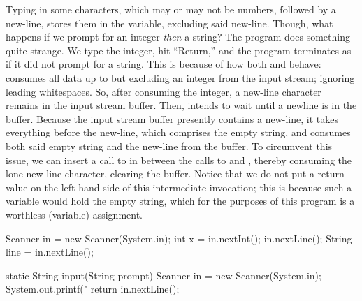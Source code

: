 Typing in some characters, which may or may not be numbers, followed by a new-line, stores them in the  variable, excluding said new-line. Though, what happens if we prompt for an integer \textit{then} a string? The program does something quite strange. We type the integer, hit ``Return,'' and the program terminates as if it did not prompt for a string. This is because of how both  and  behave:  consumes all data up to but excluding an integer from the input stream; ignoring leading whitespaces. So, after consuming the integer, a new-line character remains in the input stream buffer. Then,  intends to wait until a newline is in the buffer. Because the input stream buffer presently contains a new-line, it takes everything before the new-line, which comprises the empty string, and consumes both said empty string and the new-line from the buffer. To circumvent this issue, we can insert a call to  in between the calls to  and , thereby consuming the lone new-line character, clearing the buffer. Notice that we do not put a return value on the left-hand side of this intermediate  invocation; this is because such a variable would hold the empty string, which for the purposes of this program is a worthless (variable) assignment.

\begin{verbnobox}[\small]
Scanner in = new Scanner(System.in);
int x = in.nextInt();
in.nextLine();
String line = in.nextLine();
\end{verbnobox}


\begin{verbnobox}[\small]
static String input(String prompt) {
  Scanner in = new Scanner(System.in);
  System.out.printf("%
  return in.nextLine();
}
\end{verbnobox}

